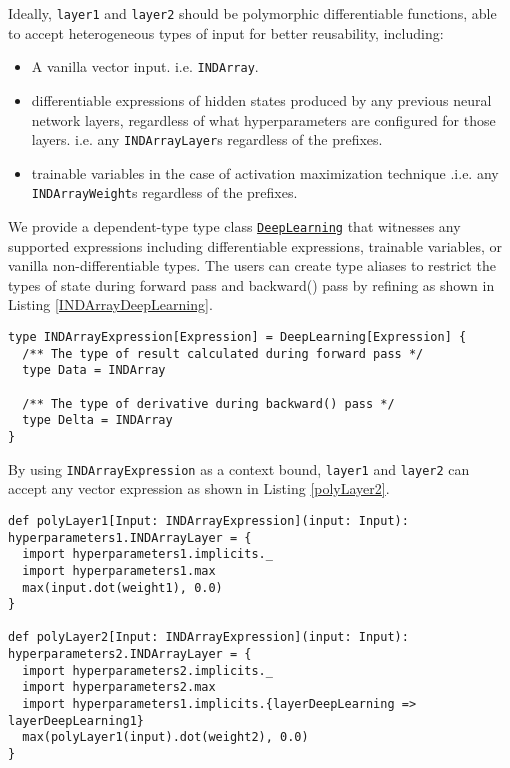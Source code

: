 Ideally, \lstinline{layer1} and \lstinline{layer2} should be polymorphic differentiable functions, able to accept heterogeneous types of input for better reusability, including:

\begin{itemize}
  
  \item A vanilla vector input. i.e. \lstinline{INDArray}.

  \item \Glspl{differentiable expression} of hidden states produced by any previous neural network layers, regardless of what hyperparameters are configured for those layers. i.e. any \lstinline{INDArrayLayer}s regardless of the prefixes.
  
  \item \Glspl{trainable variable} in the case of activation maximization technique \cite{erhan2009visualizing}.i.e. any \lstinline{INDArrayWeight}s regardless of the prefixes.

\end{itemize}

We provide a dependent-type type class \cite{gurnelltype} \href{https://javadoc.io/page/com.thoughtworks.deeplearning/deeplearning_2.11/latest/com/thoughtworks/deeplearning/DeepLearning.html}{\lstinline{DeepLearning}} that witnesses any supported expressions including \glspl{differentiable expression}, \glspl{trainable variable}, or vanilla non-differentiable types. The users can create type aliases to restrict the types of state during forward pass and backward() pass by refining  as shown in Listing \ref{INDArrayDeepLearning}.

\begin{lstlisting}[float={htbp},caption={A type class alias that witnesses dense vector expressions}, label={INDArrayDeepLearning}]
type INDArrayExpression[Expression] = DeepLearning[Expression] {
  /** The type of result calculated during forward pass */
  type Data = INDArray

  /** The type of derivative during backward() pass */
  type Delta = INDArray
}
\end{lstlisting}



By using \lstinline{INDArrayExpression} as a context bound, \lstinline{layer1} and \lstinline{layer2} can accept any vector expression as shown in Listing \ref{polyLayer2}.

\begin{lstlisting}[float={htbp},caption={Polymorphic two-layer neural network}, label={polyLayer2}]
def polyLayer1[Input: INDArrayExpression](input: Input): hyperparameters1.INDArrayLayer = {
  import hyperparameters1.implicits._
  import hyperparameters1.max
  max(input.dot(weight1), 0.0)
}

def polyLayer2[Input: INDArrayExpression](input: Input): hyperparameters2.INDArrayLayer = {
  import hyperparameters2.implicits._
  import hyperparameters2.max
  import hyperparameters1.implicits.{layerDeepLearning => layerDeepLearning1}
  max(polyLayer1(input).dot(weight2), 0.0)
}
\end{lstlisting}

